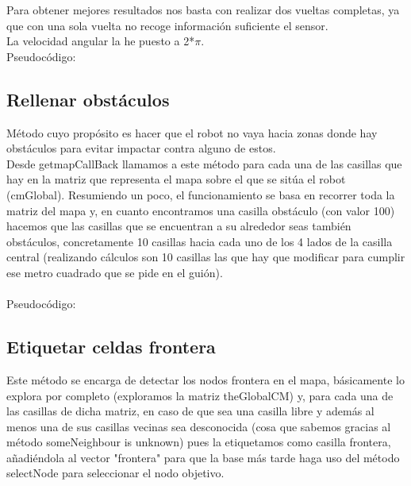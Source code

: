 Para obtener mejores resultados nos basta con realizar dos vueltas completas, ya que con una sola vuelta no recoge información suficiente el sensor.\\

La velocidad angular la he puesto a 2*$\pi$. \\ 

Pseudocódigo:


\begin{algorithmic}[1]
	\EndWhile
\end{algorithmic}

\subsection{Rellenar obstáculos}

Método cuyo propósito es hacer que el robot no vaya hacia zonas donde hay obstáculos para evitar impactar contra alguno de estos.\\
Desde getmapCallBack llamamos a este método para cada una de las casillas que hay en la matriz que representa el mapa sobre el que se sitúa el robot (cmGlobal). Resumiendo un poco, el funcionamiento se basa en recorrer toda la matriz del mapa y, en cuanto encontramos una casilla obstáculo (con valor 100) hacemos que las casillas que se encuentran a su alrededor seas también obstáculos, concretamente 10 casillas hacia cada uno de los 4 lados de la casilla central (realizando cálculos son 10 casillas las que hay que modificar para cumplir ese metro cuadrado que se pide en el guión).\\ \\
Pseudocódigo:

\begin{algorithmic}[1]
				\EndIf
			\EndFor
		\EndIf
	\EndFor
\end{algorithmic}

\subsection{Etiquetar celdas frontera}

Este método se encarga de detectar los nodos frontera en el mapa, básicamente lo explora por completo (exploramos la matriz theGlobalCM) y, para cada una de las casillas de dicha matriz, en caso de que sea una casilla libre y además al menos una de sus casillas vecinas sea desconocida (cosa que sabemos gracias al método someNeighbour is unknown) pues la etiquetamos como casilla frontera, añadiéndola al vector "frontera" para que la base más tarde haga uso del método selectNode para seleccionar el nodo objetivo.\\

